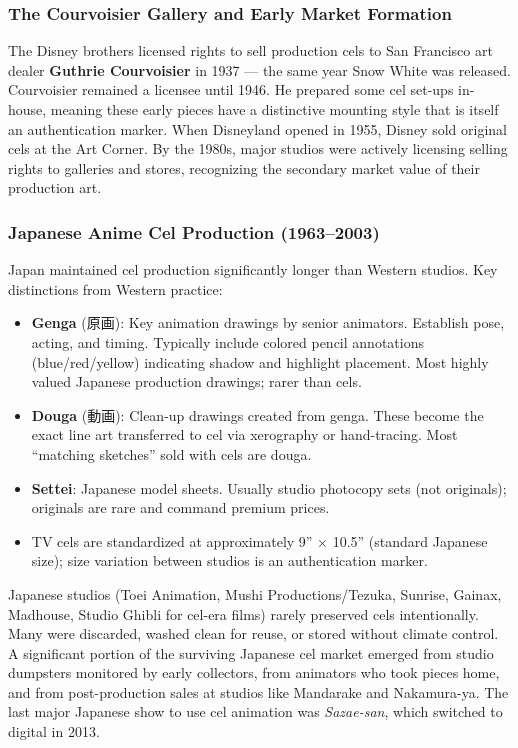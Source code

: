 \documentclass[11pt,letterpaper]{article}
\begin{document}
\subsubsection{The Courvoisier Gallery and Early Market Formation}

The Disney brothers licensed rights to sell production cels to San Francisco art dealer \textbf{Guthrie Courvoisier} in 1937 --- the same year Snow White was released. Courvoisier remained a licensee until 1946. He prepared some cel set-ups in-house, meaning these early pieces have a distinctive mounting style that is itself an authentication marker. When Disneyland opened in 1955, Disney sold original cels at the Art Corner. By the 1980s, major studios were actively licensing selling rights to galleries and stores, recognizing the secondary market value of their production art.

\subsubsection{Japanese Anime Cel Production (1963--2003)}

Japan maintained cel production significantly longer than Western studios. Key distinctions from Western practice:

\begin{itemize}
  \item \textbf{Genga} (原画): Key animation drawings by senior animators. Establish pose, acting, and timing. Typically include colored pencil annotations (blue/red/yellow) indicating shadow and highlight placement. Most highly valued Japanese production drawings; rarer than cels.
  \item \textbf{Douga} (動画): Clean-up drawings created from genga. These become the exact line art transferred to cel via xerography or hand-tracing. Most ``matching sketches'' sold with cels are douga.
  \item \textbf{Settei}: Japanese model sheets. Usually studio photocopy sets (not originals); originals are rare and command premium prices.
  \item TV cels are standardized at approximately 9'' $\times$ 10.5'' (standard Japanese size); size variation between studios is an authentication marker.
\end{itemize}

Japanese studios (Toei Animation, Mushi Productions/Tezuka, Sunrise, Gainax, Madhouse, Studio Ghibli for cel-era films) rarely preserved cels intentionally. Many were discarded, washed clean for reuse, or stored without climate control. A significant portion of the surviving Japanese cel market emerged from studio dumpsters monitored by early collectors, from animators who took pieces home, and from post-production sales at studios like Mandarake and Nakamura-ya. The last major Japanese show to use cel animation was \textit{Sazae-san}, which switched to digital in 2013.
\end{document}
